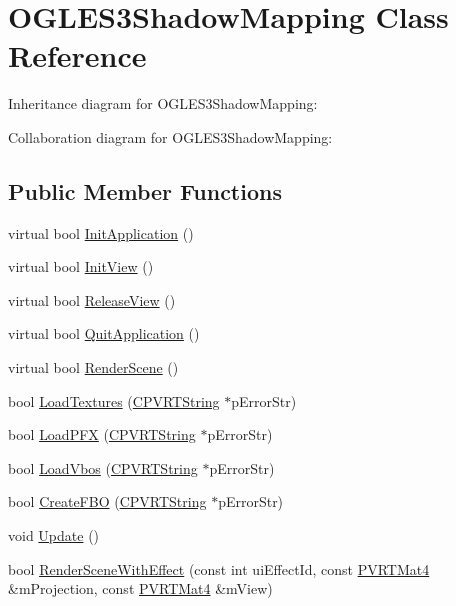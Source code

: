 \hypertarget{class_o_g_l_e_s3_shadow_mapping}{\section{O\+G\+L\+E\+S3\+Shadow\+Mapping Class Reference}
\label{class_o_g_l_e_s3_shadow_mapping}
}


Inheritance diagram for O\+G\+L\+E\+S3\+Shadow\+Mapping\+:


Collaboration diagram for O\+G\+L\+E\+S3\+Shadow\+Mapping\+:
\subsection*{Public Member Functions}
\begin{DoxyCompactItemize}
\item 
virtual bool \hyperlink{class_o_g_l_e_s3_shadow_mapping_a4ec69b709f8cceb9a8c2c8607aedce84}{Init\+Application} ()
\item 
virtual bool \hyperlink{class_o_g_l_e_s3_shadow_mapping_ae273de8d96a18000cc4b9a893e51513e}{Init\+View} ()
\item 
virtual bool \hyperlink{class_o_g_l_e_s3_shadow_mapping_a4882cab0b86529e09cf0d420436c96bf}{Release\+View} ()
\item 
virtual bool \hyperlink{class_o_g_l_e_s3_shadow_mapping_a68fe45c42e047251ca082f9ab202a2e5}{Quit\+Application} ()
\item 
virtual bool \hyperlink{class_o_g_l_e_s3_shadow_mapping_a0cca6c2a4d469cbfd52598f79a0f5992}{Render\+Scene} ()
\item 
bool \hyperlink{class_o_g_l_e_s3_shadow_mapping_a917e76f4c9aff223d1a6f344143158b9}{Load\+Textures} (\hyperlink{class_c_p_v_r_t_string}{C\+P\+V\+R\+T\+String} $\ast$p\+Error\+Str)
\item 
bool \hyperlink{class_o_g_l_e_s3_shadow_mapping_aa35da10b29680828dd663d92df7bf585}{Load\+P\+F\+X} (\hyperlink{class_c_p_v_r_t_string}{C\+P\+V\+R\+T\+String} $\ast$p\+Error\+Str)
\item 
bool \hyperlink{class_o_g_l_e_s3_shadow_mapping_a4c62806a3aa8e8c7892ead35700ad8f3}{Load\+Vbos} (\hyperlink{class_c_p_v_r_t_string}{C\+P\+V\+R\+T\+String} $\ast$p\+Error\+Str)
\item 
bool \hyperlink{class_o_g_l_e_s3_shadow_mapping_a37d7840790ef7d8266a55016f4c0e016}{Create\+F\+B\+O} (\hyperlink{class_c_p_v_r_t_string}{C\+P\+V\+R\+T\+String} $\ast$p\+Error\+Str)
\item 
void \hyperlink{class_o_g_l_e_s3_shadow_mapping_a31c4ddf1d08a8137f7fa6f923d5ccf18}{Update} ()
\item 
bool \hyperlink{class_o_g_l_e_s3_shadow_mapping_abb24f311b548b2a4b9b650991acb82c6}{Render\+Scene\+With\+Effect} (const int ui\+Effect\+Id, const \hyperlink{struct_p_v_r_t_mat4}{P\+V\+R\+T\+Mat4} \&m\+Projection, const \hyperlink{struct_p_v_r_t_mat4}{P\+V\+R\+T\+Mat4} \&m\+View)
\end{DoxyCompactItemize}


